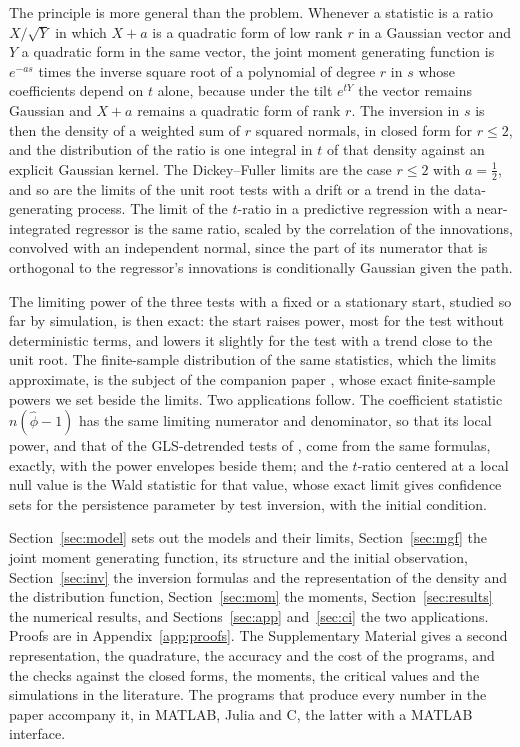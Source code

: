 \documentclass[ecta,nameyear,final]{econsocart}
\theoremstyle{plain}
\theoremstyle{definition}
\begin{document}
The principle is more general than the problem.  Whenever a statistic is a ratio $X/\sqrt Y$ in which $X+a$ is a quadratic form of low rank $r$ in a Gaussian vector and $Y$ a quadratic form in the same vector, the joint moment generating function is $e^{-as}$ times the inverse square root of a polynomial of degree $r$ in $s$ whose coefficients depend on $t$ alone, because under the tilt $e^{tY}$ the vector remains Gaussian and $X+a$ remains a quadratic form of rank $r$.  The inversion in $s$ is then the density of a weighted sum of $r$ squared normals, in closed form for $r\le2$, and the distribution of the ratio is one integral in $t$ of that density against an explicit Gaussian kernel.  The Dickey--Fuller limits are the case $r\le2$ with $a=\frac12$, and so are the limits of the unit root tests with a drift or a trend in the data-generating process.  The limit of the $t$-ratio in a predictive regression with a near-integrated regressor is the same ratio, scaled by the correlation of the innovations, convolved with an independent normal, since the part of its numerator that is orthogonal to the regressor's innovations is conditionally Gaussian given the path.

The limiting power of the three tests with a fixed or a stationary start, studied so far by simulation, is then exact: the start raises power, most for the test without deterministic terms, and lowers it slightly for the test with a trend close to the unit root.  The finite-sample distribution of the same statistics, which the limits approximate, is the subject of the companion paper \citep{BaoBrodaKan2026}, whose exact finite-sample powers we set beside the limits.  Two applications follow.  The coefficient statistic $n(\hat\phi-1)$ has the same limiting numerator and denominator, so that its local power, and that of the GLS-detrended tests of \cite{ElliottRothenbergStock1996}, come from the same formulas, exactly, with the power envelopes beside them; and the $t$-ratio centered at a local null value is the Wald statistic for that value, whose exact limit gives confidence sets for the persistence parameter by test inversion, with the initial condition.

Section~\ref{sec:model} sets out the models and their limits, Section~\ref{sec:mgf} the joint moment generating function, its structure and the initial observation, Section~\ref{sec:inv} the inversion formulas and the representation of the density and the distribution function, Section~\ref{sec:mom} the moments, Section~\ref{sec:results} the numerical results, and Sections~\ref{sec:app} and~\ref{sec:ci} the two applications.  Proofs are in Appendix~\ref{app:proofs}.  The Supplementary Material gives a second representation, the quadrature, the accuracy and the cost of the programs, and the checks against the closed forms, the moments, the critical values and the simulations in the literature.  The programs that produce every number in the paper accompany it, in MATLAB, Julia and C, the latter with a MATLAB interface.
\end{document}
